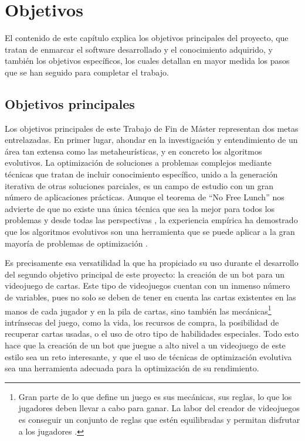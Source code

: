 \chapter{Objetivos} \label{chap:objetivos}

El contenido de este capítulo explica los objetivos principales del proyecto, que tratan de enmarcar el software desarrollado y el conocimiento adquirido, y también los objetivos específicos, los cuales detallan en mayor medida los pasos que se han seguido para completar el trabajo.

\section{Objetivos principales} \label{sec:objetivo_principal}

Los objetivos principales de este Trabajo de Fin de Máster representan dos metas entrelazadas. En primer lugar, ahondar en la investigación y entendimiento de un área tan extensa como las metaheurísticas, y en concreto los algoritmos evolutivos. La optimización de soluciones a problemas complejos mediante técnicas que tratan de incluir conocimiento específico, unido a la generación iterativa de otras soluciones parciales, es un campo de estudio con un gran número de aplicaciones prácticas. Aunque el teorema de ``No Free Lunch'' nos advierte de que no existe una única técnica que sea la mejor para todos los problemas y desde todas las perspectivas \cite{wolpert_no_1997}, la experiencia empírica ha demostrado que los algoritmos evolutivos son una herramienta que se puede aplicar a la gran mayoría de problemas de optimización \cite{torres-jimenez_applications_2014}.

Es precisamente esa versatilidad la que ha propiciado su uso durante el desarrollo del segundo objetivo principal de este proyecto: la creación de un bot para un videojuego de cartas. Este tipo de videojuegos cuentan con un inmenso número de variables, pues no solo se deben de tener en cuenta las cartas existentes en las manos de cada jugador y en la pila de cartas, sino también las mecánicas\footnote{Gran parte de lo que define un juego es sus mecánicas, sus reglas, lo que los jugadores deben llevar a cabo para ganar. La labor del creador de videojuegos es conseguir un conjunto de reglas que estén equilibradas y permitan disfrutar a los jugadores \cite{wikipedia_diseno_2025}.} intrínsecas del juego, como la vida, los recursos de compra, la posibilidad de recuperar cartas usadas, o el uso de otro tipo de habilidades especiales. Todo esto hace que la creación de un bot que juegue a alto nivel a un videojuego de este estilo sea un reto interesante, y que el uso de técnicas de optimización evolutiva sea una herramienta adecuada para la optimización de su rendimiento.

